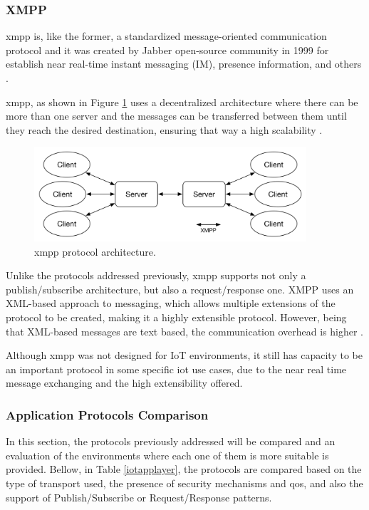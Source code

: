 \subsubsection{XMPP}

\acf{xmpp} is, like the former, a standardized message-oriented communication protocol and it was created by Jabber open-source community in 1999 for establish near real-time instant messaging (IM), presence information, and others \cite{Badugu}.

\ac{xmpp}, as shown in Figure \ref{fig:xmpp} uses a decentralized architecture where there can be more than one server and the messages can be transferred between them until they reach the desired destination, ensuring that way a high scalability \cite{Al-fuqaha2015}.

\begin{figure}[H]
	\centering
	\includegraphics[width=0.9\textwidth]{figures/xmpp.png}
	\caption{\ac{xmpp} protocol architecture.}
	\label{fig:xmpp}
\end{figure}

Unlike the protocols addressed previously, \ac{xmpp} supports not only a publish/subscribe architecture, but also a request/response one. XMPP uses an XML-based approach to messaging, which allows multiple extensions of the protocol to be created, making it a highly extensible protocol. However, being that XML-based messages are text based, the communication overhead is higher \cite{Salman2013}. 

Although \ac{xmpp} was not designed for IoT environments, it still has capacity to be an important protocol in some specific \ac{iot} use cases, due to the near real time message exchanging and the high extensibility offered.

\subsubsection{Application Protocols Comparison}

In this section, the protocols previously addressed will be compared and an evaluation of the environments where each one of them is more suitable is provided. Bellow, in Table \ref{iotapplayer}, the protocols are compared based on the type of transport used, the presence of security mechanisms and \ac{qos}, and also the support of Publish/Subscribe or Request/Response patterns.

